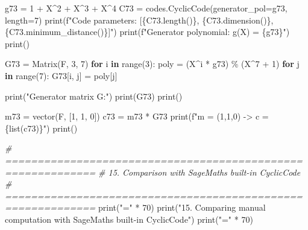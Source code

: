 \documentclass[
]{article}
\newenvironment{Shaded}{}{}
\newcommand{\BuiltInTok}[1]{\textcolor[rgb]{0.00,0.50,0.00}{#1}}
\newcommand{\CommentTok}[1]{\textcolor[rgb]{0.38,0.63,0.69}{\textit{#1}}}
\newcommand{\ControlFlowTok}[1]{\textcolor[rgb]{0.00,0.44,0.13}{\textbf{#1}}}
\newcommand{\DecValTok}[1]{\textcolor[rgb]{0.25,0.63,0.44}{#1}}
\newcommand{\KeywordTok}[1]{\textcolor[rgb]{0.00,0.44,0.13}{\textbf{#1}}}
\newcommand{\NormalTok}[1]{#1}
\newcommand{\OperatorTok}[1]{\textcolor[rgb]{0.40,0.40,0.40}{#1}}
\newcommand{\SpecialCharTok}[1]{\textcolor[rgb]{0.25,0.44,0.63}{#1}}
\newcommand{\SpecialStringTok}[1]{\textcolor[rgb]{0.73,0.40,0.53}{#1}}
\newcommand{\StringTok}[1]{\textcolor[rgb]{0.25,0.44,0.63}{#1}}
\begin{document}
\begin{Shaded}
\begin{Highlighting}[]
\NormalTok{g73 }\OperatorTok{=} \DecValTok{1} \OperatorTok{+}\NormalTok{ X}\OperatorTok{\^{}}\DecValTok{2} \OperatorTok{+}\NormalTok{ X}\OperatorTok{\^{}}\DecValTok{3} \OperatorTok{+}\NormalTok{ X}\OperatorTok{\^{}}\DecValTok{4}
\NormalTok{C73 }\OperatorTok{=}\NormalTok{ codes.CyclicCode(generator\_pol}\OperatorTok{=}\NormalTok{g73, length}\OperatorTok{=}\DecValTok{7}\NormalTok{)}
\BuiltInTok{print}\NormalTok{(}\SpecialStringTok{f"Code parameters: [}\SpecialCharTok{\{}\NormalTok{C73}\SpecialCharTok{.}\NormalTok{length()}\SpecialCharTok{\}}\SpecialStringTok{, }\SpecialCharTok{\{}\NormalTok{C73}\SpecialCharTok{.}\NormalTok{dimension()}\SpecialCharTok{\}}\SpecialStringTok{, }\SpecialCharTok{\{}\NormalTok{C73}\SpecialCharTok{.}\NormalTok{minimum\_distance()}\SpecialCharTok{\}}\SpecialStringTok{]"}\NormalTok{)}
\BuiltInTok{print}\NormalTok{(}\SpecialStringTok{f"Generator polynomial: g(X) = }\SpecialCharTok{\{}\NormalTok{g73}\SpecialCharTok{\}}\SpecialStringTok{"}\NormalTok{)}
\BuiltInTok{print}\NormalTok{()}

\NormalTok{G73 }\OperatorTok{=}\NormalTok{ Matrix(F, }\DecValTok{3}\NormalTok{, }\DecValTok{7}\NormalTok{)}
\ControlFlowTok{for}\NormalTok{ i }\KeywordTok{in} \BuiltInTok{range}\NormalTok{(}\DecValTok{3}\NormalTok{):}
\NormalTok{    poly }\OperatorTok{=}\NormalTok{ (X}\OperatorTok{\^{}}\NormalTok{i }\OperatorTok{*}\NormalTok{ g73) }\OperatorTok{\%}\NormalTok{ (X}\OperatorTok{\^{}}\DecValTok{7} \OperatorTok{+} \DecValTok{1}\NormalTok{)}
    \ControlFlowTok{for}\NormalTok{ j }\KeywordTok{in} \BuiltInTok{range}\NormalTok{(}\DecValTok{7}\NormalTok{):}
\NormalTok{        G73[i, j] }\OperatorTok{=}\NormalTok{ poly[j]}

\BuiltInTok{print}\NormalTok{(}\StringTok{"Generator matrix G:"}\NormalTok{)}
\BuiltInTok{print}\NormalTok{(G73)}
\BuiltInTok{print}\NormalTok{()}

\NormalTok{m73 }\OperatorTok{=}\NormalTok{ vector(F, [}\DecValTok{1}\NormalTok{, }\DecValTok{1}\NormalTok{, }\DecValTok{0}\NormalTok{])}
\NormalTok{c73 }\OperatorTok{=}\NormalTok{ m73 }\OperatorTok{*}\NormalTok{ G73}
\BuiltInTok{print}\NormalTok{(}\SpecialStringTok{f"m = (1,1,0) {-}\textgreater{} c = }\SpecialCharTok{\{}\BuiltInTok{list}\NormalTok{(c73)}\SpecialCharTok{\}}\SpecialStringTok{"}\NormalTok{)}
\BuiltInTok{print}\NormalTok{()}

\CommentTok{\# ============================================================}
\CommentTok{\# 15. Comparison with SageMath\textquotesingle{}s built{-}in CyclicCode}
\CommentTok{\# ============================================================}
\BuiltInTok{print}\NormalTok{(}\StringTok{"="} \OperatorTok{*} \DecValTok{70}\NormalTok{)}
\BuiltInTok{print}\NormalTok{(}\StringTok{"15. Comparing manual computation with SageMath\textquotesingle{}s built{-}in CyclicCode"}\NormalTok{)}
\BuiltInTok{print}\NormalTok{(}\StringTok{"="} \OperatorTok{*} \DecValTok{70}\NormalTok{)}


\end{Highlighting}
\end{Shaded}
\end{document}
